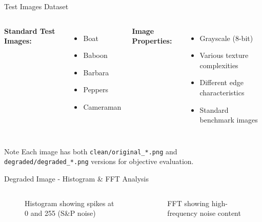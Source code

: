 \documentclass[aspectratio=169]{beamer}
\begin{document}
\begin{frame}{Test Images Dataset}
    \begin{columns}
        \textbf{Standard Test Images:}
        \begin{itemize}
            \item Boat
            \item Baboon
            \item Barbara
            \item Peppers
            \item Cameraman
        \end{itemize}
        
        \textbf{Image Properties:}
        \begin{itemize}
            \item Grayscale (8-bit)
            \item Various texture complexities
            \item Different edge characteristics
            \item Standard benchmark images
        \end{itemize}
    \end{columns}
    
    \vspace{0.5cm}
    \begin{block}{Note}
        Each image has both \texttt{clean/original\_*.png} and \texttt{degraded/degraded\_*.png} versions for objective evaluation.
    \end{block}
\end{frame}

\begin{frame}{Degraded Image - Histogram \& FFT Analysis}
    \begin{columns}
        \begin{figure}
            \centering
            \caption{Histogram showing spikes at 0 and 255 (S\&P noise)}
        \end{figure}
        
        \begin{figure}
            \centering
            \caption{FFT showing high-frequency noise content}
        \end{figure}
    \end{columns}
\end{frame}
\end{document}
